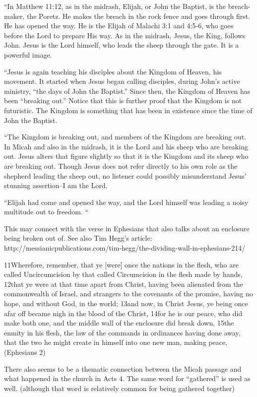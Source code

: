 \documentclass[11pt]{article}
\begin{document}
“In Matthew 11:12, as in the midrash, Elijah, or John the Baptist, is
the breach-maker, the Poretz. He makes the breach in the rock fence
and goes through first. He has opened the way. He is the Elijah of
Malachi 3:1 and 4:5-6, who goes before the Lord to prepare His way. As
in the midrash, Jesus, the King, follows John. Jesus is the Lord
himself, who leads the sheep through the gate. It is a powerful image.

“Jesus is again teaching his disciples about the Kingdom of Heaven,
his movement. It started when Jesus began calling disciples, during
John’s active ministry, “the days of John the Baptist.” Since then,
the Kingdom of Heaven has been “breaking out.” Notice that this is
further proof that the Kingdom is not futuristic. The Kingdom is
something that has been in existence since the time of John the
Baptist.

“The Kingdom is breaking out, and members of the Kingdom are breaking
out. In Micah and also in the midrash, it is the Lord and his sheep
who are breaking out. Jesus alters that figure slightly so that it is
the Kingdom and its sheep who are breaking out. Though Jesus does not
refer directly to his own role as the shepherd leading the sheep out,
no listener could possibly misunderstand Jesus’ stunning assertion–I
am the Lord.

“Elijah had come and opened the way, and the Lord himself was leading
a noisy multitude out to freedom. “

This may connect with the verse in Ephesians that also talks about an enclosure being broken out of. See also Tim Hegg’s article: http://messianicpublications.com/tim-hegg/the-dividing-wall-in-ephesians-214/


11Wherefore, remember, that ye [were] once the nations in the flesh, who are called Uncircumcision by that called Circumcision in the flesh made by hands, 12that ye were at that time apart from Christ, having been alienated from the commonwealth of Israel, and strangers to the covenants of the promise, having no hope, and without God, in the world; 13and now, in Christ Jesus, ye being once afar off became nigh in the blood of the Christ, 14for he is our peace, who did make both one, and the middle wall of the enclosure did break down, 15the enmity in his flesh, the law of the commands in ordinances having done away, that the two he might create in himself into one new man, making peace, (Ephesians 2)

There also seems to be a thematic connection between the Micah passage and what happened in the church in Acts 4. The same word for “gathered” is used as well. (although that word is relatively common for being gathered together)
\end{document}
